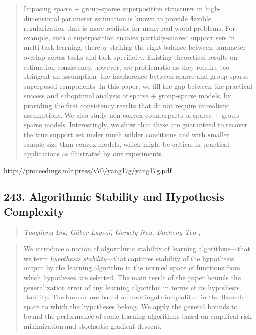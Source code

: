 \documentclass{article}
\begin{document}
\begin{quote}
    Imposing sparse + group-sparse superposition structures in high-dimensional parameter estimation is known to provide flexible regularization that is more realistic for many real-world problems. For example, such a superposition enables partially-shared support sets in multi-task learning, thereby striking the right balance between parameter overlap across tasks and task specificity. Existing theoretical results on estimation consistency, however, are problematic as they require too stringent an assumption: the incoherence between sparse and group-sparse superposed components. In this paper, we fill the gap between the practical success and suboptimal analysis of sparse + group-sparse models, by providing the first consistency results that do not require unrealistic assumptions. We also study non-convex counterparts of sparse + group-sparse models. Interestingly, we show that these are guaranteed to recover the true support set under much milder conditions and with smaller sample size than convex models, which might be critical in practical applications as illustrated by our experiments.  
\end{quote}

\href{http://proceedings.mlr.press/v70/yang17g/yang17g.pdf}{http://proceedings.mlr.press/v70/yang17g/yang17g.pdf}

\subsection{243. Algorithmic Stability and Hypothesis Complexity}

\begin{quote}
\footnotesize{\textit{Tongliang Liu, Gábor Lugosi, Gergely Neu, Dacheng Tao ;}}

\end{quote}

\begin{quote}
    We introduce a notion of algorithmic stability of learning algorithms—that we term \textit{hypothesis stability}—that captures stability of the hypothesis output by the learning algorithm in the normed space of functions from which hypotheses are selected. The main result of the paper bounds the generalization error of any learning algorithm in terms of its hypothesis stability. The bounds are based on martingale inequalities in the Banach space to which the hypotheses belong. We apply the general bounds to bound the performance of some learning algorithms based on empirical risk minimization and stochastic gradient descent.  
\end{quote}
\end{document}
